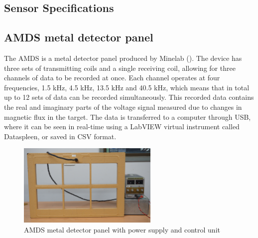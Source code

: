 \documentclass[main.tex]{subfiles}
\begin{document}
\begin{appendices}




\chapter{Sensor Specifications}
\section{AMDS metal detector panel}
The AMDS is a metal detector panel produced by Minelab (). The device has three sets of transmitting coils and a single receiving coil, allowing for three channels of data to be recorded at once. Each channel operates at four frequencies, 1.5 kHz, 4.5 kHz, 13.5 kHz and 40.5 kHz, which means that in total up to 12 sets of data can be recorded simultaneously. This recorded data contains the real and imaginary parts of the voltage signal measured due to changes in magnetic flux in the target. The data is transferred to a computer through USB, where it can be seen in real-time using a LabVIEW virtual instrument called Dataspleen, or saved in CSV format. 

\begin{figure}[ht]
\includegraphics[width=0.6\textwidth]{3-ConceptDesign/AMDS.JPG}
\centering
\caption{AMDS metal detector panel with power supply and control unit} 
\end{figure}


\end{appendices}
\end{document}

